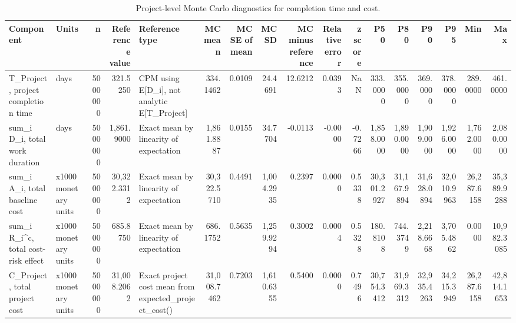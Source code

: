 \begin{table}
\caption{Project-level Monte Carlo diagnostics for completion time and cost.}
\label{tab:project-level-duration-cost-diagnostics}
\begin{tabular}{llrrlrrrrrrrrrrrr}
\toprule
Component & Units & n & Reference value & Reference type & MC mean & MC SE of mean & MC SD & MC minus reference & Relative error & z score & P50 & P80 & P90 & P95 & Min & Max \\
\midrule
T\_Project, project completion time & days & 5000000 & 321.5250 & CPM using E[D\_i], not analytic E[T\_Project] & 334.1462 & 0.0109 & 24.4691 & 12.6212 & 0.0393 & NaN & 333.0000 & 355.0000 & 369.0000 & 378.0000 & 289.0000 & 461.0000 \\
sum\_i D\_i, total work duration & days & 5000000 & 1,861.9000 & Exact mean by linearity of expectation & 1,861.8887 & 0.0155 & 34.7704 & -0.0113 & -0.0000 & -0.7266 & 1,858.0000 & 1,890.0000 & 1,909.0000 & 1,926.0000 & 1,762.0000 & 2,080.0000 \\
sum\_i A\_i, total baseline cost & x1000 monetary units & 5000000 & 30,322.3312 & Exact mean by linearity of expectation & 30,322.5710 & 0.4491 & 1,004.2935 & 0.2397 & 0.0000 & 0.5338 & 30,301.2927 & 31,167.9894 & 31,628.0894 & 32,010.9963 & 26,287.6158 & 35,389.9288 \\
sum\_i R\_i\textasciicircum c, total cost-risk effect & x1000 monetary units & 5000000 & 685.8750 & Exact mean by linearity of expectation & 686.1752 & 0.5635 & 1,259.9294 & 0.3002 & 0.0004 & 0.5328 & 180.8108 & 744.3749 & 2,218.6668 & 3,705.4862 & 0.0000 & 10,982.3085 \\
C\_Project, total project cost & x1000 monetary units & 5000000 & 31,008.2062 & Exact project cost mean from expected\_project\_cost() & 31,008.7462 & 0.7203 & 1,610.6355 & 0.5400 & 0.0000 & 0.7496 & 30,754.3412 & 31,969.3312 & 32,935.4263 & 34,215.3949 & 26,287.6158 & 42,814.1653 \\
\bottomrule
\end{tabular}
\end{table}
